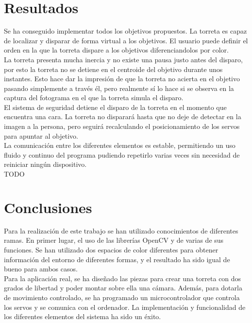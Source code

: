 \section{Resultados}
Se ha conseguido implementar todos los objetivos propuestos. La torreta es capaz de localizar y disparar de forma virtual a los objetivos. El usuario puede definir el orden en la que la torreta dispare a los objetivos diferenciandolos por color.\\

La torreta presenta mucha inercia y no existe una pausa justo antes del disparo, por esto la torreta no se detiene en el centroide del objetivo durante unos instantes. Esto hace dar la impresión de que la torreta no acierta en el objetivo pasando simplemente a través él, pero realmente sí lo hace si se observa en la captura del fotograma en el que la torreta simula el disparo.\\

El sistema de seguridad detiene el disparo de la torreta en el momento que encuentra una cara. 
La torreta no disparará hasta que no deje de detectar en la imagen a la persona, pero seguirá recalculando el posicionamiento de los servos para apuntar al objetivo.\\

La comunicación entre los diferentes elementos es estable, permitiendo un uso fluido y continuo del programa pudiendo repetirlo varias veces sin necesidad de reiniciar ningún dispositivo.\\
TODO

\newpage


\section{Conclusiones}
Para la realización de este trabajo se han utilizado conocimientos de diferentes ramas. En primer lugar, el uso de las librerías OpenCV y de varias de sus funciones. Se han utilizado dos espacios de color diferentes para obtener información del entorno de diferentes formas, y el resultado ha sido igual de bueno para ambos casos.\\

Para la aplicación real, se ha diseñado las piezas para crear una torreta con dos grados de libertad y poder montar sobre ella una cámara. Además, para dotarla de movimiento controlado, se ha programado un microcontrolador que controla los servos y se comunica con el ordenador. La implementación y funcionalidad de los diferentes elementos del sistema ha sido un éxito.\\


